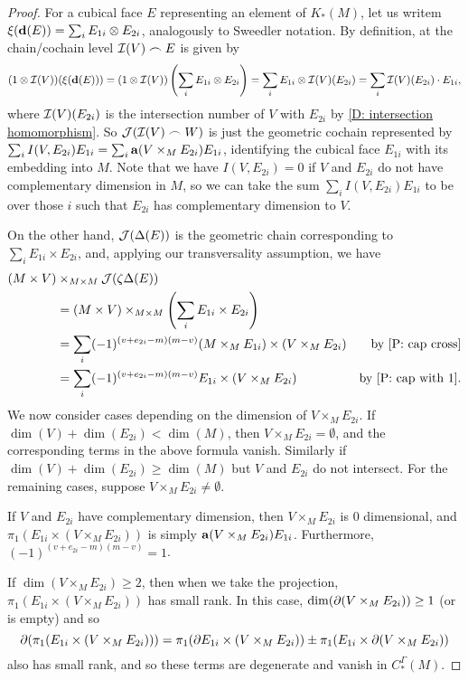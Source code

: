 \begin{proof}
For a cubical face $E$ representing an element of $K_*(M)$, let us writem$\xi(\mathbf{d} (E)) = \sum_i E_{1i} \otimes E_{2i}$, analogously to Sweedler notation. By definition, at the chain/cochain level $\mathcal{I}(V)\frown E$ is given by
$$(1 \otimes \mathcal{I}(V))(\xi(\mathbf{d} (E))) = (1 \otimes \mathcal{I}(V))\left(\sum_i E_{1i} \otimes E_{2i}\right) = \sum_i E_{1i} \otimes \mathcal{I}(V)(E_{2i}) = \sum_i \mathcal{I}(V)(E_{2i})\cdot E_{1i},$$
where $\mathcal{I}(V)(E_{2i})$ is the intersection number of $V$ with $E_{2i}$ by \cref{D: intersection homomorphism}. So $\mathcal{J}(\mathcal{I}(V)\frown W)$ is just the geometric cochain represented by $\sum_i I(V,E_{2i})E_{1i} = \sum_i \mathbf{a}(V \times_M E_{2i})E_{1i} $, identifying the cubical face $E_{1i}$ with its embedding into $M$. Note that we have $I(V,E_{2i}) = 0$ if $V$ and $E_{2i}$ do not have complementary dimension in $M$, so we can take the sum $\sum_i I(V,E_{2i})E_{1i}$ to be over those $i$ such that $E_{2i}$ has complementary dimension to $V$.

On the other hand, $\mathcal{J}(\Delta(E))$ is the geometric chain corresponding to $\sum_i E_{1i} \times E_{2i}$, and, applying our transversality assumption, we have
\begin{align*}
(M \times V)&\times_{M \times M}\mc J(\zeta\Delta(E))\\
& = (M \times V)\times_{M \times M}\left(\sum_i E_{1i} \times E_{2i}\right)\\
& = \sum_i (-1)^{(v+e_{2i}-m)(m-v)}(M \times_M E_{1i}) \times (V \times_M E_{2i})&\text{by \cref{P: cap cross}}\\
& = \sum_i (-1)^{(v+e_{2i}-m)(m-v)}E_{1i} \times (V \times_M E_{2i})&\text{by \cref{P: cap with 1}}.
\end{align*}
We now consider cases depending on the dimension of $V \times_M E_{2i}$. If $\dim(V)+\dim(E_{2i})<\dim (M)$, then $V \times_M E_{2i} = \emptyset$, and the corresponding terms in the above formula vanish. Similarly if $\dim(V)+\dim(E_{2i})\geq \dim (M)$ but $V$ and $E_{2i}$ do not intersect. For the remaining cases, suppose
$V \times_M E_{2i}\neq \emptyset$.

If $V$ and $E_{2i}$ have complementary dimension, then $V \times_M E_{2i}$ is $0$ dimensional, and $\pi_1(
E_{1i} \times (V \times_M E_{2i}))$ is simply $\mathbf{a}(V \times_M E_{2i})E_{1i}$. Furthermore, $(-1)^{(v+e_{2i}-m)(m-v)} = 1$.

If $\dim(V \times_M E_{2i})\geq 2$, then when we take the projection,
 $\pi_1(E_{1i} \times (V \times_M E_{2i}))$ has small rank. In this case, $\dim(\partial (V \times_M E_{2i}))\geq 1$ (or is empty) and so
$$\partial(\pi_1(E_{1i} \times (V \times_M E_{2i}))) = \pi_1(\partial E_{1i} \times (V \times_M E_{2i}))\pm \pi_1(E_{1i}\times\partial(V \times_M E_{2i}))$$
also has small rank, and so these terms are degenerate and vanish in $C^\Gamma_*(M)$.


\end{proof}

